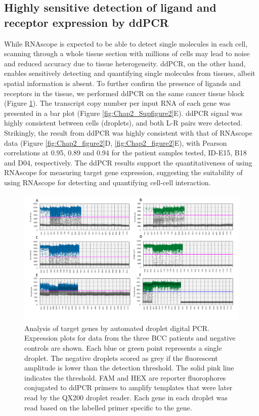 \subsection{Highly sensitive detection of ligand and receptor expression by ddPCR}
While RNAscope is expected to be able to detect single molecules in each cell, scanning through a whole tissue section with millions of cells may lead to noise and reduced accuracy due to tissue heterogeneity. ddPCR, on the other hand, enables sensitively detecting and quantifying single molecules from tissues, albeit spatial information is absent. To further confirm the presence of ligands and receptors in the tissue, we performed ddPCR on the same cancer tissue block (Figure  \ref{fig:Chap2_Supfigure6}). The transcript copy number per input RNA of each gene was presented in a bar plot (Figure \ref{fig:Chap2_Supfigure2}E). ddPCR signal was highly consistent between cells (droplets), and both L-R pairs were detected. Strikingly, the result from ddPCR was highly consistent with that of RNAscope data (Figure \ref{fig:Chap2_figure2}D, \ref{fig:Chap2_figure2}E), with Pearson correlations at 0.95, 0.89 and 0.94 for the patient samples tested, ID-E15, B18 and D04, respectively. The ddPCR results support the quantitativeness of using RNAscope for measuring target gene expression, suggesting the suitability of using RNAscope for detecting and quantifying cell-cell interaction. 

\begin{figure}[htp]
\renewcommand{\figurename}{Figure}
    \centering
    \includegraphics[width=0.75\columnwidth]{Chapter2/Figures/Supplemental_Fig_S6.png}
    \caption[Analysis of target genes by automated droplet digital PCR.]{Analysis of target genes by automated droplet digital PCR. Expression plots for data from the three BCC patients and negative controls are shown. Each blue or green point represents a single droplet. The negative droplets scored as grey if the fluorescent amplitude is lower than the detection threshold. The solid pink line indicates the threshold. FAM and HEX are reporter fluorophores conjugated to ddPCR primers to amplify templates that were later read by the QX200 droplet reader. Each gene in each droplet was read based on the labelled primer specific to the gene.}
    \label{fig:Chap2_Supfigure6}
\end{figure}


